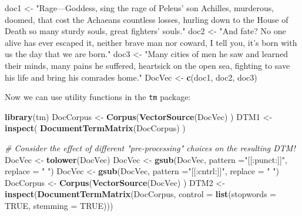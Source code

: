 \documentclass[]{book}
\newenvironment{Shaded}{\begin{snugshade}}{\end{snugshade}}
\newcommand{\KeywordTok}[1]{\textcolor[rgb]{0.13,0.29,0.53}{\textbf{#1}}}
\newcommand{\DataTypeTok}[1]{\textcolor[rgb]{0.13,0.29,0.53}{#1}}
\newcommand{\StringTok}[1]{\textcolor[rgb]{0.31,0.60,0.02}{#1}}
\newcommand{\CommentTok}[1]{\textcolor[rgb]{0.56,0.35,0.01}{\textit{#1}}}
\newcommand{\OtherTok}[1]{\textcolor[rgb]{0.56,0.35,0.01}{#1}}
\newcommand{\NormalTok}[1]{#1}
\theoremstyle{definition}
\theoremstyle{definition}
\theoremstyle{definition}
\theoremstyle{remark}
\begin{document}
\begin{Shaded}
\begin{Highlighting}[]
\NormalTok{doc1 <-}\StringTok{ "Rage---Goddess, sing the rage of Peleus’ son Achilles,}
\StringTok{    murderous, doomed, that cost the Achaeans countless losses,}
\StringTok{    hurling down to the House of Death so many sturdy souls,}
\StringTok{    great fighters’ souls."}
\NormalTok{doc2 <-}\StringTok{ "And fate? No one alive has ever escaped it,}
\StringTok{  neither brave man nor coward, I tell you, }
\StringTok{it's born with us the day that we are born."}
\NormalTok{doc3 <-}\StringTok{ "Many cities of men he saw and learned their minds,}
\StringTok{          many pains he suffered, heartsick on the open sea,}
\StringTok{          fighting to save his life and bring his comrades home."}
\NormalTok{DocVec <-}\StringTok{ }\KeywordTok{c}\NormalTok{(doc1, doc2, doc3)}
\end{Highlighting}
\end{Shaded}

Now we can use utility functions in the \texttt{tm} package:

\begin{Shaded}
\begin{Highlighting}[]
\KeywordTok{library}\NormalTok{(tm)}
\NormalTok{DocCorpus <-}\StringTok{ }\KeywordTok{Corpus}\NormalTok{(}\KeywordTok{VectorSource}\NormalTok{(DocVec) ) }
\NormalTok{DTM1 <-}\StringTok{  }\KeywordTok{inspect}\NormalTok{( }\KeywordTok{DocumentTermMatrix}\NormalTok{(DocCorpus) ) }

\CommentTok{# Consider the effect of different "pre-processing" choices on the resulting DTM!}
\NormalTok{DocVec <-}\StringTok{ }\KeywordTok{tolower}\NormalTok{(DocVec)}
\NormalTok{DocVec <-}\StringTok{ }\KeywordTok{gsub}\NormalTok{(DocVec, }\DataTypeTok{pattern =}\StringTok{"[[:punct:]]"}\NormalTok{, }\DataTypeTok{replace =} \StringTok{" "}\NormalTok{)}
\NormalTok{DocVec <-}\StringTok{ }\KeywordTok{gsub}\NormalTok{(DocVec, }\DataTypeTok{pattern =}\StringTok{"[[:cntrl:]]"}\NormalTok{, }\DataTypeTok{replace =} \StringTok{" "}\NormalTok{)}
\NormalTok{DocCorpus <-}\StringTok{ }\KeywordTok{Corpus}\NormalTok{(}\KeywordTok{VectorSource}\NormalTok{(DocVec) ) }
\NormalTok{DTM2 <-}\StringTok{  }\KeywordTok{inspect}\NormalTok{(}\KeywordTok{DocumentTermMatrix}\NormalTok{(DocCorpus, }
                                    \DataTypeTok{control =} \KeywordTok{list}\NormalTok{(}\DataTypeTok{stopwords =} \OtherTok{TRUE}\NormalTok{,  }\DataTypeTok{stemming =} \OtherTok{TRUE}\NormalTok{))) }
\end{Highlighting}
\end{Shaded}
\end{document}
